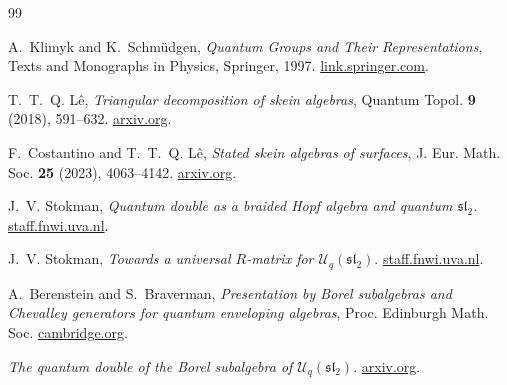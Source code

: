 \documentclass[11pt]{amsart}
\numberwithin{equation}{section}
\theoremstyle{definition}
\theoremstyle{remark}
\newcommand{\Uc}{\mathcal{U}}
\begin{document}
\begin{thebibliography}{99}

A.~Klimyk and K.~Schm\"udgen,
\emph{Quantum Groups and Their Representations},
Texts and Monographs in Physics, Springer, 1997.
\newblock \href{https://link.springer.com/book/10.1007/978-3-642-60834-6}{link.springer.com}.

T.~T.~Q. L\^e,
\emph{Triangular decomposition of skein algebras},
Quantum Topol. \textbf{9} (2018), 591--632.
\newblock \href{https://arxiv.org/abs/1609.04987}{arxiv.org}.

F.~Costantino and T.~T.~Q. L\^e,
\emph{Stated skein algebras of surfaces},
J. Eur. Math. Soc. \textbf{25} (2023), 4063--4142.
\newblock \href{https://arxiv.org/abs/1907.11400}{arxiv.org}.

J.~V. Stokman,
\emph{Quantum double as a braided Hopf algebra and quantum \(\mathfrak{sl}_2\)}.
\newblock \href{https://staff.fnwi.uva.nl/j.v.stokman/quantumdouble2.pdf}{staff.fnwi.uva.nl}.

J.~V. Stokman,
\emph{Towards a universal \(R\)-matrix for \(\Uc_q(\mathfrak{sl}_2)\)}.
\newblock \href{https://staff.fnwi.uva.nl/j.v.stokman/Quantumsl2.pdf}{staff.fnwi.uva.nl}.

A.~Berenstein and S.~Braverman,
\emph{Presentation by Borel subalgebras and Chevalley generators for quantum
enveloping algebras},
Proc. Edinburgh Math. Soc.
\newblock \href{https://www.cambridge.org/core/services/aop-cambridge-core/content/view/886B0B4D8E3D242A51A0380A486351EA/S0013091504000689a.pdf/presentation-by-borel-subalgebras-and-chevalley-generators-for-quantum-enveloping-algebras.pdf}{cambridge.org}.

\emph{The quantum double of the Borel subalgebra of \(\Uc_q(\mathfrak{sl}_2)\)}.
\newblock \href{https://arxiv.org/pdf/math/0512563}{arxiv.org}.

\end{thebibliography}
\end{document}
